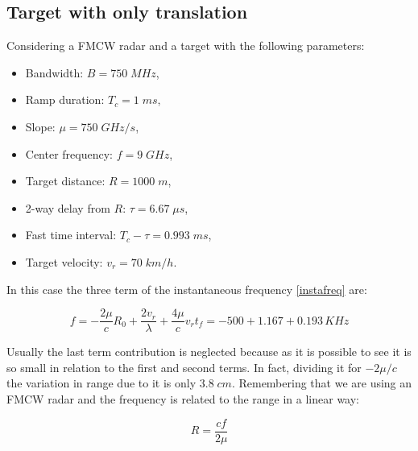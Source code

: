 \subsection{Target with only translation}
Considering a FMCW radar and a target with the following parameters: 
 
\begin{itemize}
    \item Bandwidth: $B = 750\; MHz$,
         
    \item Ramp duration: $T_{c} = 1\; ms$,
    
    \item Slope: $\mu = 750\; GHz/s$,
    
    \item Center frequency: $f = 9\; GHz$,

    \item Target distance: $R = 1000\; m$,
    
    \item 2-way delay from $R$: $\tau = 6.67 \;\mu s $,
    
    \item Fast time interval: $T_{c} -\tau = 0.993 \; ms $,
    
    \item Target velocity: $v_{r} = 70 \; km/h$.

\end{itemize}

In this case the three term of the instantaneous frequency \ref{instafreq} are:
 
\begin{equation}
   f = -\frac{2 \mu}{c} R_{0}+\frac{2 v_{r}}{\lambda}+\frac{4 \mu}{c} v_{r} t_{f} = -500 + 1.167 +0.193\, KHz
    \label{firstordershift}
\end{equation}

Usually the last term contribution is neglected because as it is possible to see it is so small in relation to the first and second terms. In fact, dividing it for $-2\mu/c$ the variation in range due to it is only $3.8 \; cm$. Remembering that we are using an FMCW radar and the frequency is related to the range in a linear way:

\begin{equation}
    R = \frac{c f}{2 \mu} 
\end{equation}

